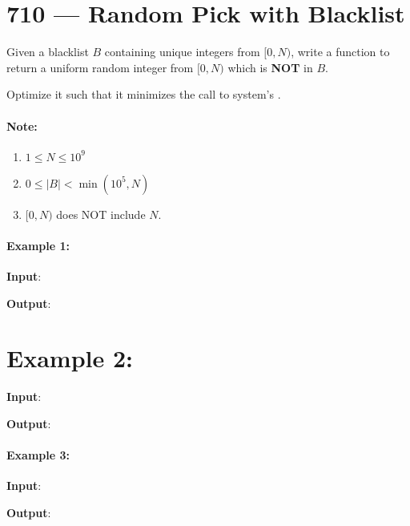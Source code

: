 \section{710 --- Random Pick with Blacklist}
Given a blacklist $B$ containing unique integers from $[0, N)$, write a function to return a uniform random integer from $[0, N)$ which is \textbf{NOT} in $B$.

Optimize it such that it minimizes the call to system's .

\paragraph{Note:}

\begin{enumerate}
\item $1 \leq N \leq 10^9$
\item $0 \leq \lvert B\rvert < \min(10^5, N)$
\item $[0, N)$ does NOT include $N$. 
\end{enumerate}

\paragraph{Example 1:}

\begin{flushleft}
\textbf{Input}: 


\fcj{[[1,[]],[],[],[]]}

\textbf{Output}: \fcj{[null,0,0,0]}
\end{flushleft}

\section{Example 2:}

\begin{flushleft}
\textbf{Input}: 


\fcj{[[2,[]],[],[],[]]}

\textbf{Output}: \fcj{[null,1,1,1]}
\end{flushleft}

\paragraph{Example 3:}

\begin{flushleft}
\textbf{Input}: 

\fcj{[[3,[1]],[],[],[]]}

\textbf{Output}: \fcj{[null,0,0,2]}
\end{flushleft}


